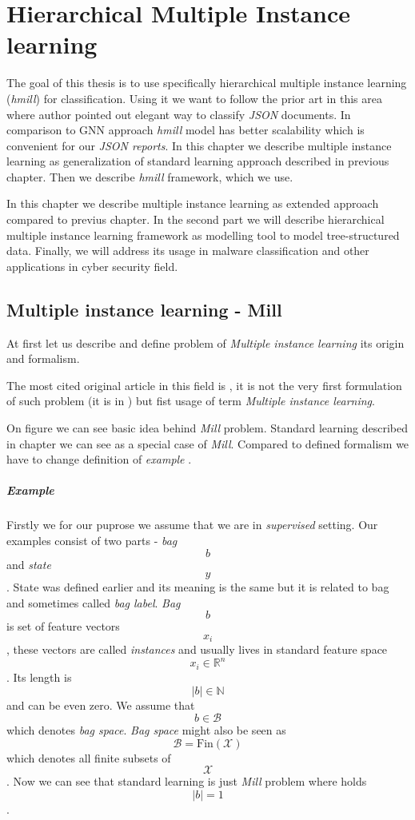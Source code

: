 \chapter{Hierarchical Multiple Instance learning} \label{chap:hmill}



The goal of this thesis is to use specifically hierarchical multiple instance learning (\emph{hmill}) for classification. Using it we want to follow the prior art in this area \cite{Mandlik2020} where author pointed out elegant way to classify \emph{JSON} documents. In comparison to GNN approach \emph{hmill} model has better scalability \cite{Mandlik2020} which is convenient for our \emph{JSON reports}. In this chapter we describe multiple instance learning as generalization of standard learning approach described in previous chapter. Then we describe \emph{hmill} framework, which we use.


In this chapter we describe multiple instance learning as extended approach compared to previus chapter. In the second part we will describe hierarchical multiple instance learning framework as modelling tool to model tree-structured data. Finally, we will address its usage in malware classification and other applications in cyber security field.

\section{Multiple instance learning - Mill}
At first let us describe and define problem of \emph{Multiple instance learning} its origin and formalism.

The most cited original article in this field is \citet{Dietterich1997}, it is not the very first formulation of such problem (it is in \cite{Keeler1991}) but fist usage of term \emph{Multiple instance learning}.

On figure  we can see basic idea behind \emph{Mill} problem. Standard learning described in chapter  we can see as a special case of \emph{Mill}. Compared to defined formalism we have to change definition of \emph{example} . 
\paragraph{Example}
Firstly we for our puprose we assume that we are in \emph{supervised} setting. Our examples consist of two parts - \emph{bag} $$b$$ and \emph{state} $$y$$. State was defined earlier and its meaning is the same but it is related to bag and sometimes called \emph{bag label}. \emph{Bag} $$b$$ is set of feature vectors $$x_i$$, these vectors are called \emph{instances} and usually lives in standard feature space $$x_i \in \mathbb{R}^{n}$$. Its length is $$|b| \in \mathbb{N}$$ and can be even zero. We assume that $$b \in \mathcal{B}$$ which denotes \emph{bag space}. \emph{Bag space} might also be seen as $$\mathcal{B} = \mathrm{Fin}(\mathcal{X})$$ which denotes all finite subsets of $$\mathcal{X}$$. Now we can see that standard learning is just \emph{Mill} problem where holds $$|b| = 1$$.

